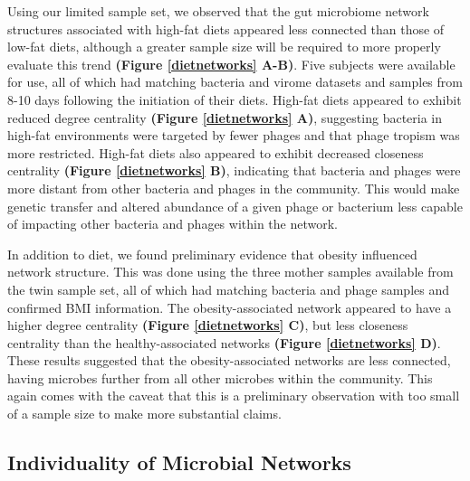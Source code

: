 \documentclass[12pt,]{article}
\begin{document}
Using our limited sample set, we observed that the gut microbiome
network structures associated with high-fat diets appeared less
connected than those of low-fat diets, although a greater sample size
will be required to more properly evaluate this trend \textbf{(Figure
\ref{dietnetworks} A-B)}. Five subjects were available for use, all of
which had matching bacteria and virome datasets and samples from 8-10
days following the initiation of their diets. High-fat diets appeared to
exhibit reduced degree centrality \textbf{(Figure \ref{dietnetworks}
A)}, suggesting bacteria in high-fat environments were targeted by fewer
phages and that phage tropism was more restricted. High-fat diets also
appeared to exhibit decreased closeness centrality \textbf{(Figure
\ref{dietnetworks} B)}, indicating that bacteria and phages were more
distant from other bacteria and phages in the community. This would make
genetic transfer and altered abundance of a given phage or bacterium
less capable of impacting other bacteria and phages within the network.

In addition to diet, we found preliminary evidence that obesity
influenced network structure. This was done using the three mother
samples available from the twin sample set, all of which had matching
bacteria and phage samples and confirmed BMI information. The
obesity-associated network appeared to have a higher degree centrality
\textbf{(Figure \ref{dietnetworks} C)}, but less closeness centrality
than the healthy-associated networks \textbf{(Figure \ref{dietnetworks}
D)}. These results suggested that the obesity-associated networks are
less connected, having microbes further from all other microbes within
the community. This again comes with the caveat that this is a
preliminary observation with too small of a sample size to make more
substantial claims.

\subsection{Individuality of Microbial
Networks}\label{individuality-of-microbial-networks}
\end{document}
